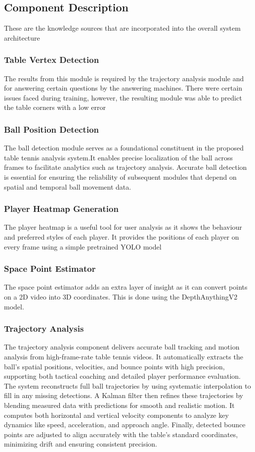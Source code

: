 \documentclass[conference]{IEEEtran}
\begin{document}
\subsection{Component Description}
These are the knowledge sources that are incorporated into the overall system architecture
\subsubsection{Table Vertex Detection}
The results from this module is required by the trajectory analysis module and for answering certain questions by the answering machines. There were certain issues faced during training, however, the resulting module was able to predict the table corners with a low error

\subsubsection{Ball Position Detection}
The ball detection module serves as a foundational constituent in the proposed table tennis analysis system.It enables precise localization of the ball across frames to facilitate analytics such as trajectory analysis. Accurate ball detection is essential for ensuring the reliability of subsequent modules that depend on spatial and temporal ball movement data.
\subsubsection{Player Heatmap Generation}
The player heatmap is a useful tool for user analysis as it shows the behaviour and preferred styles of each player. It provides the positions of each player on every frame using a simple pretrained YOLO model 
\subsubsection{Space Point Estimator}
The space point estimator adds an extra layer of insight as it can convert points on a 2D video into 3D coordinates. This is done using the DepthAnythingV2 model. 
\subsubsection{Trajectory Analysis}
The trajectory analysis component delivers accurate ball tracking and motion analysis from high-frame-rate table tennis videos. It automatically extracts the ball’s spatial positions, velocities, and bounce points with high precision, supporting both tactical coaching and detailed player performance evaluation.
The system reconstructs full ball trajectories by using systematic interpolation to fill in any missing detections. A Kalman filter then refines these trajectories by blending measured data with predictions for smooth and realistic motion. It computes both horizontal and vertical velocity components to analyze key dynamics like speed, acceleration, and approach angle. Finally, detected bounce points are adjusted to align accurately with the table’s standard coordinates, minimizing drift and ensuring consistent precision.
\end{document}
